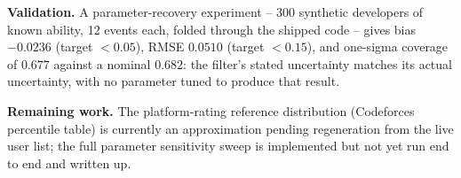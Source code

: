 \documentclass[11pt,a4paper]{article}
\begin{document}
\textbf{Validation.} A parameter-recovery experiment -- 300 synthetic
developers of known ability, 12 events each, folded through the shipped
code -- gives bias $-0.0236$ (target $<0.05$), RMSE $0.0510$ (target
$<0.15$), and one-sigma coverage of $0.677$ against a nominal $0.682$: the
filter's stated uncertainty matches its actual uncertainty, with no
parameter tuned to produce that result.

\textbf{Remaining work.} The platform-rating reference distribution
(Codeforces percentile table) is currently an approximation pending
regeneration from the live user list; the full parameter sensitivity sweep
is implemented but not yet run end to end and written up.
\end{document}
